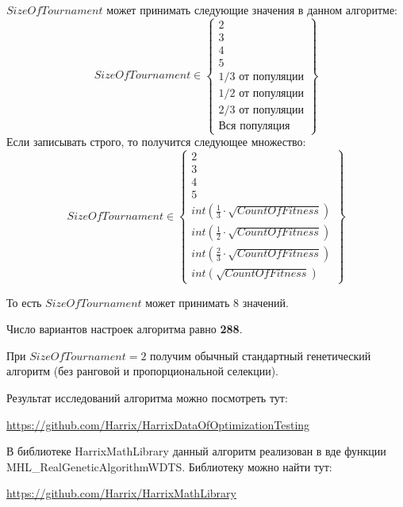 $SizeOfTournament$ может принимать следующие значения в данном алгоритме:
\begin{equation}
SizeOfTournament \in \begin{Bmatrix}
2\\ 
3\\ 
4\\ 
5\\ 
1/3\text{ от популяции}\\ 
1/2\text{ от популяции}\\ 
2/3\text{ от популяции}\\ 
\text{Вся популяция} 
\end{Bmatrix}
\end{equation}
Если записывать строго, то получится следующее множество:
\begin{equation}
SizeOfTournament \in \begin{Bmatrix}
2\\ 
3\\ 
4\\ 
5\\ 
int\left( \frac{1}{3}\cdot  \sqrt{CountOfFitness}\right)  \\ 
int\left( \frac{1}{2}\cdot  \sqrt{CountOfFitness}\right)\\ 
int\left( \frac{2}{3}\cdot  \sqrt{CountOfFitness}\right)\\ 
int\left( \sqrt{CountOfFitness}\right)
\end{Bmatrix}
\end{equation}

То есть $SizeOfTournament$ может принимать $ 8 $ значений.

Число вариантов настроек алгоритма равно \textbf{288}.

При $ SizeOfTournament=2 $ получим обычный стандартный генетический алгоритм (без ранговой и пропорциональной селекции).

Результат исследований алгоритма можно посмотреть тут:

\href{https://github.com/Harrix/HarrixDataOfOptimizationTesting}{https://github.com/Harrix/HarrixDataOfOptimizationTesting}

В библиотеке HarrixMathLibrary данный алгоритм реализован в вде функции MHL\_RealGeneticAlgorithmWDTS. Библиотеку можно найти тут:

\href{https://github.com/Harrix/HarrixMathLibrary}{https://github.com/Harrix/HarrixMathLibrary}